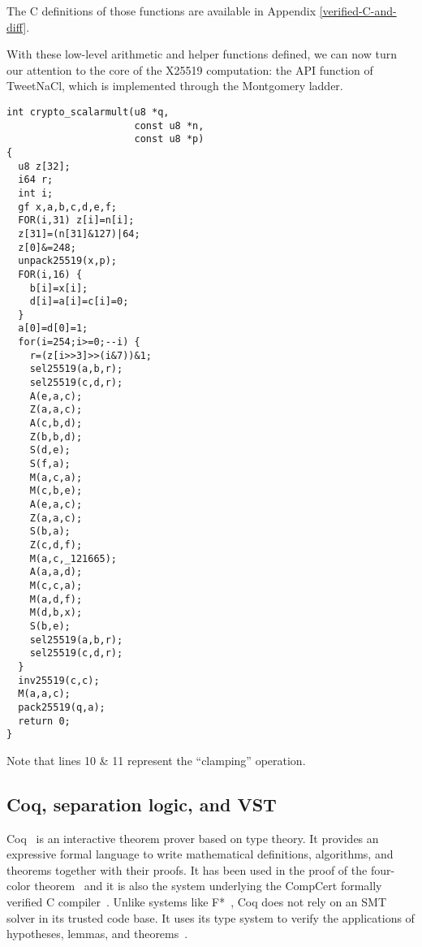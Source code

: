 The C definitions of those functions are available in
Appendix \ref{verified-C-and-diff}.

With these low-level arithmetic and helper functions defined,
we can now turn our attention to the core of the X25519 computation:
the  API function of TweetNaCl,
which is implemented through the Montgomery ladder.

\begin{lstlisting}[language=Ctweetnacl]
int crypto_scalarmult(u8 *q,
                      const u8 *n,
                      const u8 *p)
{
  u8 z[32];
  i64 r;
  int i;
  gf x,a,b,c,d,e,f;
  FOR(i,31) z[i]=n[i];
  z[31]=(n[31]&127)|64;
  z[0]&=248;
  unpack25519(x,p);
  FOR(i,16) {
    b[i]=x[i];
    d[i]=a[i]=c[i]=0;
  }
  a[0]=d[0]=1;
  for(i=254;i>=0;--i) {
    r=(z[i>>3]>>(i&7))&1;
    sel25519(a,b,r);
    sel25519(c,d,r);
    A(e,a,c);
    Z(a,a,c);
    A(c,b,d);
    Z(b,b,d);
    S(d,e);
    S(f,a);
    M(a,c,a);
    M(c,b,e);
    A(e,a,c);
    Z(a,a,c);
    S(b,a);
    Z(c,d,f);
    M(a,c,_121665);
    A(a,a,d);
    M(c,c,a);
    M(a,d,f);
    M(d,b,x);
    S(b,e);
    sel25519(a,b,r);
    sel25519(c,d,r);
  }
  inv25519(c,c);
  M(a,a,c);
  pack25519(q,a);
  return 0;
}
\end{lstlisting}

Note that lines 10 \& 11 represent the ``clamping'' operation.


\subsection{Coq, separation logic, and VST}
\label{subsec:Coq-VST}

Coq~\cite{coq-faq} is an interactive theorem prover based on type theory. It
provides an expressive formal language to write mathematical definitions,
algorithms, and theorems together with their proofs. It has been used in the proof
of the four-color theorem~\cite{gonthier2008formal} and it is also the system
underlying the CompCert formally verified C compiler~\cite{Leroy-backend}.
Unlike systems like F*~\cite{DBLP:journals/corr/BhargavanDFHPRR17},
Coq does not rely on an SMT solver in its trusted code base.
It uses its type system to verify the applications of hypotheses,
lemmas, and theorems~\cite{Howard1995-HOWTFN}.

